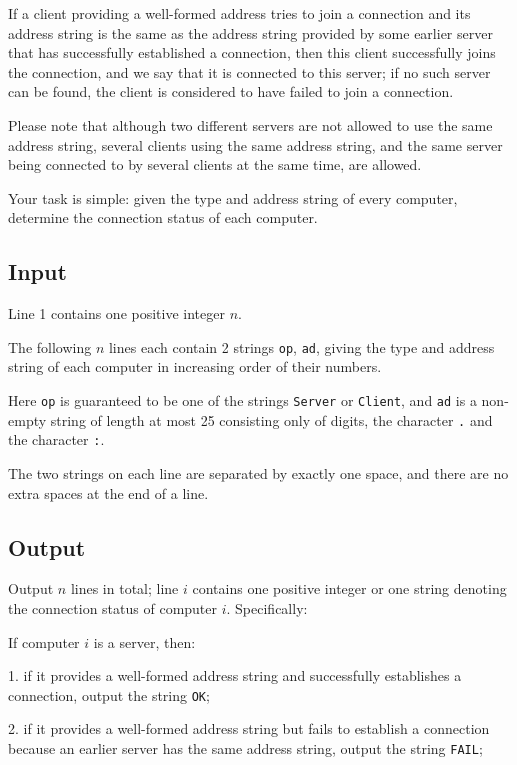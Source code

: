 \documentclass[11pt]{article}
\begin{document}
If a client providing a well-formed address tries to join a connection and
its address string is the same as the address string provided by some
earlier server that has successfully established a connection,
then this client successfully joins the connection, and we say that it is
connected to this server;
if no such server can be found, the client is considered to have failed to
join a connection.

Please note that although two different servers are not allowed to use the
same address string,
several clients using the same address string, and the same server being
connected to by several clients at the same time, are allowed.

Your task is simple:
given the type and address string of every computer, determine the
connection status of each computer.

\subsection*{Input}

Line 1 contains one positive integer $n$.

The following $n$ lines each contain 2 strings \texttt{op}, \texttt{ad},
giving the type and address string of each computer in increasing order of
their numbers.

Here \texttt{op} is guaranteed to be one of the strings \texttt{Server}
or \texttt{Client},
and \texttt{ad} is a non-empty string of length at most 25 consisting only
of digits, the character \texttt{.} and the character \texttt{:}.

The two strings on each line are separated by exactly one space, and there
are no extra spaces at the end of a line.

\subsection*{Output}

Output $n$ lines in total;
line $i$ contains one positive integer or one string denoting the
connection status of computer $i$.
Specifically:

If computer $i$ is a server, then:

1. if it provides a well-formed address string and successfully establishes
a connection, output the string \texttt{OK};

2. if it provides a well-formed address string but fails to establish a
connection because an earlier server has the same address string,
output the string \texttt{FAIL};
\end{document}

